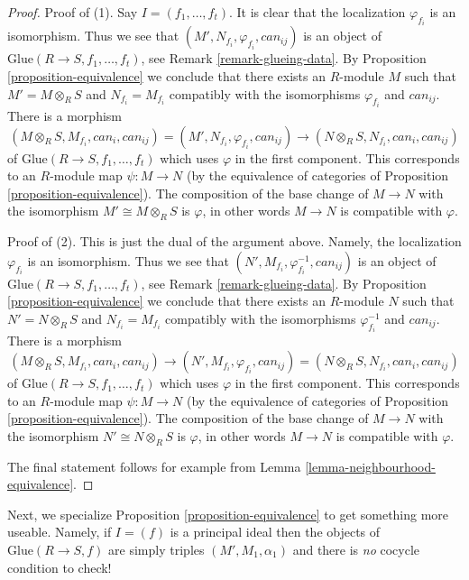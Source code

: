\begin{proof}
Proof of (1). Say $I = (f_1, \ldots, f_t)$. It is clear that
the localization $\varphi_{f_i}$ is an isomorphism.
Thus we see that $(M', N_{f_i}, \varphi_{f_i}, can_{ij})$ is an
object of $\text{Glue}(R \to S, f_1, \ldots, f_t)$, see
Remark \ref{remark-glueing-data}.
By Proposition \ref{proposition-equivalence}
we conclude that there exists an $R$-module $M$ such that
$M' = M \otimes_R S$ and $N_{f_i} = M_{f_i}$ compatibly
with the isomorphisms $\varphi_{f_i}$ and $can_{ij}$. There is a
morphism
$$
(M \otimes_R S, M_{f_i}, can_i, can_{ij}) =
(M', N_{f_i}, \varphi_{f_i}, can_{ij})
\to
(N \otimes_R S, N_{f_i}, can_i, can_{ij})
$$
of $\text{Glue}(R \to S, f_1, \ldots, f_t)$
which uses $\varphi$ in the first component. This
corresponds to an $R$-module map $\psi : M \to N$ (by the equivalence of
categories of Proposition \ref{proposition-equivalence}).
The composition of the base change of $M \to N$ with the
isomorphism $M' \cong M \otimes_R S$ is $\varphi$, in other words
$M \to N$ is compatible with $\varphi$.

\medskip\noindent
Proof of (2). This is just the dual of the argument above.
Namely, the localization $\varphi_{f_i}$ is an isomorphism.
Thus we see that $(N', M_{f_i}, \varphi_{f_i}^{-1}, can_{ij})$ is an
object of $\text{Glue}(R \to S, f_1, \ldots, f_t)$, see
Remark \ref{remark-glueing-data}.
By Proposition \ref{proposition-equivalence}
we conclude that there exists an $R$-module $N$ such that
$N' = N \otimes_R S$ and $N_{f_i} = M_{f_i}$ compatibly
with the isomorphisms $\varphi_{f_i}^{-1}$ and $can_{ij}$. There is a
morphism
$$
(M \otimes_R S, M_{f_i}, can_i, can_{ij}) \to
(N', M_{f_i}, \varphi_{f_i}, can_{ij}) =
(N \otimes_R S, N_{f_i}, can_i, can_{ij})
$$
of $\text{Glue}(R \to S, f_1, \ldots, f_t)$
which uses $\varphi$ in the first component. This
corresponds to an $R$-module map $\psi : M \to N$ (by the equivalence of
categories of Proposition \ref{proposition-equivalence}).
The composition of the base change of $M \to N$ with the
isomorphism $N' \cong N \otimes_R S$ is $\varphi$, in other words
$M \to N$ is compatible with $\varphi$.

\medskip\noindent
The final statement follows for example from
Lemma \ref{lemma-neighbourhood-equivalence}.
\end{proof}

\noindent
Next, we specialize Proposition \ref{proposition-equivalence} to get something
more useable. Namely, if $I = (f)$ is a principal ideal then the objects
of $\text{Glue}(R \to S, f)$ are simply triples $(M', M_1, \alpha_1)$
and there is {\it no} cocycle condition to check!

